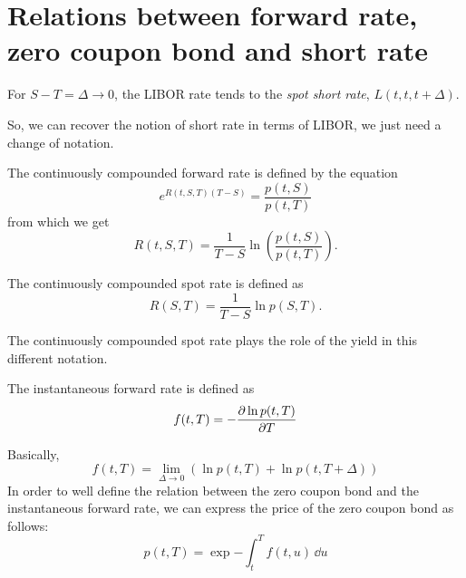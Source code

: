 \section[Relations between \texorpdfstring{$f(t,T)$}{f(t,T)}, \texorpdfstring{$p(t,T)$}{p(t,T)} and \texorpdfstring{$r(t)$}{r(t)}]{Relations between forward rate, zero coupon bond and short rate}
\begin{remark} %
    For $S-T=\Delta\to 0$, the LIBOR rate tends to the \emph{spot short rate}, $L(t,t,t+\Delta)$.
\end{remark}
So, we can recover the notion of short rate in terms of LIBOR, we just need a change of notation.
\begin{definition}
    The continuously compounded forward rate is defined by the equation
    \begin{equation}
        e^{R(t,S,T)(T-S)} = \frac{p(t,S)}{p(t,T)}
    \end{equation}
    from which we get
    \begin{equation}
        R(t,S,T) = \frac{1}{T-S}\ln\left(\frac{p(t,S)}{p(t,T)}\right).
    \end{equation}
\end{definition}
\begin{definition}
    The continuously compounded spot rate is defined as
    \begin{equation}
        R(S,T) = \frac{1}{T-S}\ln p(S,T).
    \end{equation}
\end{definition}
The continuously compounded spot rate plays the role of the yield in this different notation.
\begin{definition}
    The instantaneous forward rate is defined as
    \begin{equation}\label{forwrate}
        f(t,T) = -\pdv{\ln p(t,T)}{T}
    \end{equation}
\end{definition}
Basically,
\begin{equation}
    f(t,T) = \lim_{\Delta \to 0} (\ln p(t,T) + \ln p(t, T+\Delta))
\end{equation}
In order to well define the relation between the zero coupon bond and the instantaneous forward rate, we can express the price of the zero coupon bond as follows:
\begin{equation}
    p(t,T) = \exp{-\int_t^T f(t,u)\,\dd u}
\end{equation}
